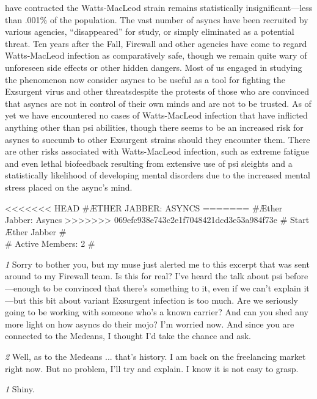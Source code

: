 have contracted the Watts-MacLeod strain remains statistically insignificant—less than .001\% of the population. The vast number of asyncs have been recruited by various agencies, “disappeared” for study, or simply eliminated as a potential threat. Ten years after the Fall, Firewall and other agencies have come to regard Watts-MacLeod infection as comparatively safe, though we remain quite wary of unforeseen side effects or other hidden dangers. Most of us engaged in studying the phenomenon now consider asyncs to be useful as a tool for fighting the Exsurgent virus and other threatsdespite the protests of those who are convinced that asyncs are not in control of their own minds and are not to be trusted. As of yet we have encountered no cases of Watts-MacLeod infection that have inflicted anything other than psi abilities, though there seems to be an increased risk for asyncs to succumb to other Exsurgent strains should they encounter them. There are other risks associated with Watts-MacLeod infection, such as extreme fatigue and even lethal biofeedback resulting from extensive use of psi sleights and a statistically likelihood of developing mental disorders due to the increased mental stress placed on the async’s mind. 

\newpage

<<<<<<< HEAD \#{ÆTHER JABBER: ASYNCS} ======= \#{Æther Jabber: Asyncs} >>>>>>> 069efc938e743c2e1f7048421dcd3e53a984f73e \# Start Æther Jabber \# \\ \# Active Members: 2 \# 

\textit{\textit{1}} Sorry to bother you, but my muse just alerted me to this excerpt that was sent around to my Firewall team. Is this for real? I’ve heard the talk about psi before—enough to be convinced that there’s something to it, even if we can’t explain it—but this bit about variant Exsurgent infection is too much. Are we seriously going to be working with someone who’s a known carrier? And can you shed any more light on how asyncs do their mojo? I’m worried now. And since you are connected to the Medeans, I thought I’d take the chance and ask. 

\textit{\textit{2}} Well, as to the Medeans ... that’s history. I am back on the freelancing market right now. But no problem, I’ll try and explain. I know it is not easy to grasp. 

\textit{\textit{1}} Shiny. 

